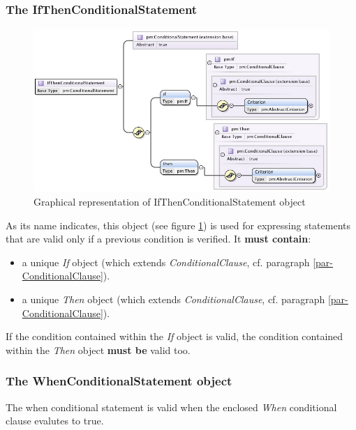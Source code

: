 \documentclass[a4paper,11pt] {ivoa}
\begin{document}
\subsubsection{The IfThenConditionalStatement}\label{par-IfThenConditionalStatement}
\begin{figure}[htbp]
\begin{center}
\includegraphics[width=1.0\textwidth]{pictures/IfThenStatement.jpg} 
\caption{Graphical representation of IfThenConditionalStatement object}
\label{Pic-IfThenConditionalStatement}
\end{center}
\end{figure}
As its name indicates, this object (see figure \ref{Pic-IfThenConditionalStatement}) is used for
expressing statements that are valid only if a previous condition is verified. It {\bf must
contain}:
\begin{itemize}
\item a unique {\it If} object (which extends {\it ConditionalClause}, cf. paragraph
\ref{par-ConditionalClause}).
\item a unique {\it Then} object (which extends {\it ConditionalClause}, cf. paragraph
\ref{par-ConditionalClause}).
\end{itemize}
If the condition contained within the {\it If} object is valid, the condition contained within
the {\it Then} object {\bf must be} valid too.

\subsubsection{The WhenConditionalStatement object}\label{par-WhenConditionalStatment}

The when conditional statement is valid when the enclosed {\it When} conditional clause
evalutes to true.
\end{document}
